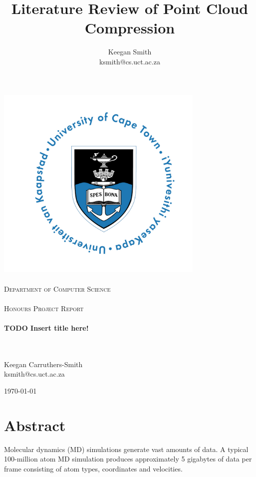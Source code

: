 \documentclass{report}
\title{Literature Review of Point Cloud Compression}
\author{Keegan Smith\\ksmith@cs.uct.ac.za}
\begin{document}
\begin{titlepage}
\begin{center}
\includegraphics[width=100mm]{images/uct}\\
\ \\
\textsc{\Large
Department of Computer Science\\
\ \\
Honours Project Report\\
\ \\}
%
%
{\huge \bfseries
TODO Insert title here!
\\}
\ \\
\ \\

\begin{center}
    \large Keegan Carruthers-Smith%
    \\
    \small{ksmith@cs.uct.ac.za}%
\end{center}

\vfill %
%
{\large \today}
%
\end{center}
\end{titlepage}


\section*{Abstract}
Molecular dynamics (MD) simulations generate vast amounts of data. A typical
100-million atom MD simulation produces approximately 5 gigabytes of data per
frame consisting of atom types, coordinates and velocities.
\end{document}
